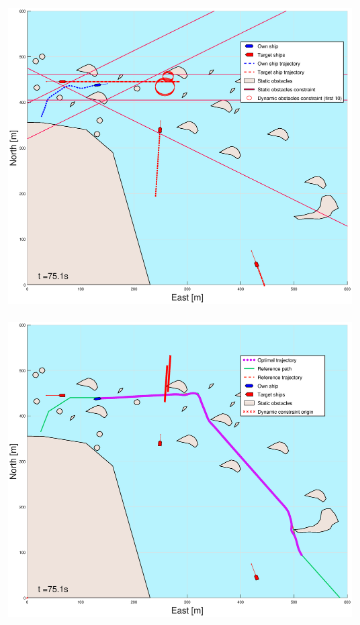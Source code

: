 \begin{figure}[!b]
\begin{subfigure}[b]{0.499\textwidth}
    \end{subfigure}
    \hfill
    \\
    \begin{subfigure}[b]{0.49\textwidth}
        \centering
        \includegraphics[width=\textwidth]{Images/Figures/skjergard_m_trafikk_NEW/_Simple_1fig1_time=75}
    \end{subfigure}
    \hfill
    \begin{subfigure}[b]{0.499\textwidth}
        \centering
        \includegraphics[width=\textwidth]{Images/Figures/skjergard_m_trafikk_NEW/_Simple_1fig999_time=75}
    \end{subfigure}
    \hfill
\end{figure}%
